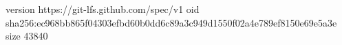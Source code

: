 version https://git-lfs.github.com/spec/v1
oid sha256:ec968bb865f04303efbd60b0dd6c89a3c949d1550f02a4e789ef8150e69e5a3e
size 43840
